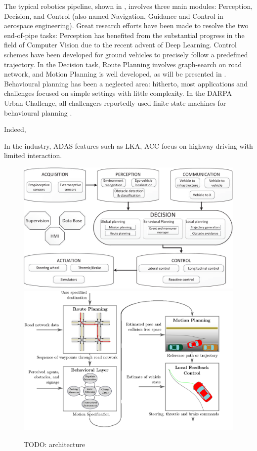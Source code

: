 The typical robotics pipeline, shown in , involves three main modules: Perception, Decision, and Control (also named Navigation, Guidance and Control in aerospace engineering).
Great research efforts have been made to resolve the two end-of-pipe tasks: Perception has benefited from the substantial progress in the field of Computer Vision due to the recent advent of Deep Learning. Control schemes have been developed for ground vehicles to precisely follow a predefined trajectory.
In the Decision task, Route Planning involves graph-search on road network, and Motion Planning is well developed, as will be presented in . Behavioural planning has been a neglected area: hitherto, most applications and challenges focused on simple settings with little complexity. In the DARPA Urban Challenge, all challengers reportedly used finite state machines for behavioural planning \citep{Buehler2009}. 

Indeed, 

In the industry, ADAS features such as LKA, ACC focus on highway driving with limited interaction. 
\begin{figure}[tp]
	\centering
	\includegraphics[width=0.7\linewidth]{img/architecture-blocks}
	\includegraphics[width=0.7\linewidth]{img/architecture-square}
	\caption{TODO: architecture}
	\label{fig:robotics-pipeline}
\end{figure}

